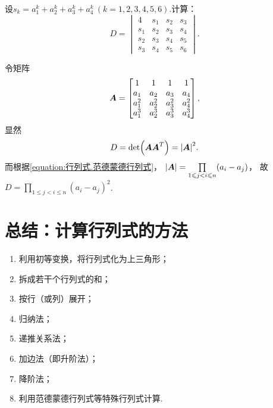 \begin{example}
设\(s_k = a_1^k + a_2^k + a_3^k + a_4^k\ (k=1,2,3,4,5,6)\).计算：\[
D = \begin{vmatrix}
4 & s_1 & s_2 & s_3 \\
s_1 & s_2 & s_3 & s_4 \\
s_2 & s_3 & s_4 & s_5 \\
s_3 & s_4 & s_5 & s_6
\end{vmatrix}.
\]
\begin{solution}
令矩阵\[
\boldsymbol{A} = \begin{bmatrix}
1 & 1 & 1 & 1 \\
a_1 & a_2 & a_3 & a_4 \\
a_1^2 & a_2^2 & a_3^2 & a_4^2 \\
a_1^3 & a_2^3 & a_3^3 & a_4^3
\end{bmatrix},
\]显然\[
D = \det(\boldsymbol{A}\boldsymbol{A}^T) = \abs{\boldsymbol{A}}^2.
\]
而根据\cref{equation:行列式.范德蒙德行列式}，
\(\abs{\boldsymbol{A}}
= \prod\limits_{1 \leqslant j < i \leqslant n} (a_i - a_j)\)，
故\(D = \prod\limits_{1 \leqslant j < i \leqslant n} (a_i - a_j)^2\).
\end{solution}
\end{example}

\section{总结：计算行列式的方法}
\begin{enumerate}
\item 利用初等变换，将行列式化为上三角形；
\item 拆成若干个行列式的和；
\item 按行（或列）展开；
\item 归纳法；
\item 递推关系法；
\item 加边法（即升阶法）；
\item 降阶法；
\item 利用范德蒙德行列式等特殊行列式计算.
\end{enumerate}
